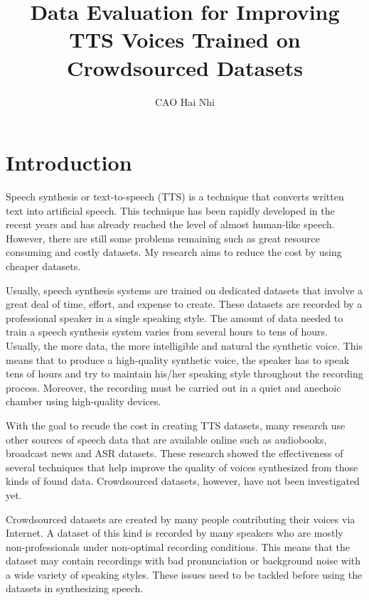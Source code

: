 \documentclass[12pt]{article}
\title{Data Evaluation for Improving TTS Voices Trained on Crowdsourced Datasets}
\author{CAO Hai Nhi}
\begin{document}
\titlepage
\cmemberspage
\firstabstract
%
%
\toc
\newpage
\listoffigures

\listoftables
%
%
\newpage


\section{Introduction}
Speech synthesis or text-to-speech (TTS) is a technique that converts written text into artificial speech. This technique has been rapidly developed in the recent years and has already reached the level of almost human-like speech. However, there are still some problems remaining such as great resource consuming and costly datasets. My research aims to reduce the cost by using cheaper datasets.

Usually, speech synthesis systems are trained on dedicated datasets that involve a great deal of time, effort, and expense to create. These datasets are recorded by a professional speaker in a single speaking style. The amount of data needed to train a speech synthesis system varies from several hours to tens of hours. Usually, the more data, the more intelligible and natural the synthetic voice. This means that to produce a high-quality synthetic voice, the speaker has to speak tens of hours and try to maintain his/her speaking style throughout the recording process. Moreover, the recording must be carried out in a quiet and anechoic chamber using high-quality devices.

With the goal to recude the cost in creating TTS datasets, many research use other sources of speech data that are available online such as audiobooks, broadcast news and ASR datasets. These research showed the effectiveness of several techniques that help improve the quality of voices synthesized from those kinds of found data. Crowdsourced datasets, however, have not been investigated yet.

Crowdsourced datasets are created by many people contributing their voices via Internet. A dataset of this kind is recorded by many speakers who are mostly non-professionals under non-optimal recording conditions. This means that the dataset may contain recordings with bad pronunciation or background noise with a wide variety of speaking styles. These issues need to be tackled before using the datasets in synthesizing speech.
\end{document}
